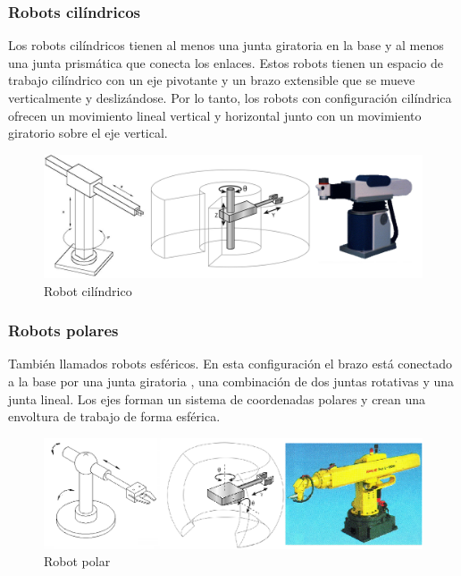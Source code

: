          \newpage

        
        \subsubsection{Robots cilíndricos}
        
        Los robots cilíndricos tienen al menos una junta giratoria en la base y al menos una junta prismática que conecta los enlaces. Estos robots tienen un espacio de trabajo cilíndrico con un eje pivotante y un brazo extensible que se mueve verticalmente y deslizándose. Por lo tanto, los robots con configuración cilíndrica ofrecen un movimiento lineal vertical y horizontal junto con un movimiento giratorio sobre el eje vertical.
        
        \begin{figure}[htb]
            \centering
            \includegraphics[width=1.0\linewidth]{Main/Chapter2/Images2/Robot-cilindrico.png}
            \caption{Robot cilíndrico \cite{cap2_class_polar_1}\cite{cap2_class_polar_cilin_2}\cite{cap2_class_polar_3}}
            \label{f:Cap2_segunMovimiento_cilindrico}
        \end{figure}
        
        \subsubsection{Robots polares}
        
        También llamados robots esféricos. En esta configuración el brazo está conectado a la base por una junta giratoria , una combinación de dos juntas rotativas y una junta lineal. Los ejes forman un sistema de coordenadas polares y crean una envoltura de trabajo de forma esférica.
        
        \begin{figure}[htb]
            \centering
            \includegraphics[width=1.0\linewidth]{Main/Chapter2/Images2/robot-polar.png}
            \caption{Robot polar \cite{cap2_class_polar_1}\cite{cap2_class_polar_cilin_2}  }
            \label{f:Cap2_segunMovimiento_polar}
        \end{figure}
    
